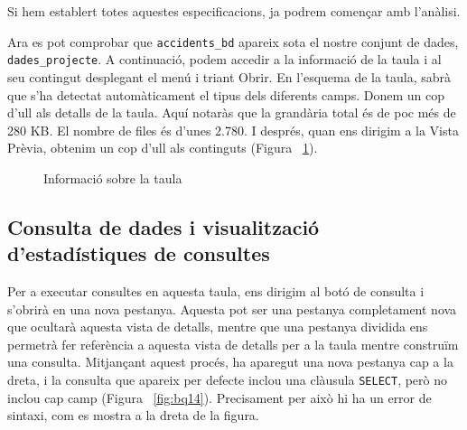\documentclass[12pt,longbibliography]{article}
\theoremstyle{definition}
\theoremstyle{remark}
\begin{document}
\vspace{2mm}

Si hem establert totes aquestes especificacions, ja podrem començar amb l’anàlisi.

\vspace{2mm}

Ara es pot comprobar que \verb|accidents_bd| apareix sota el nostre conjunt de dades, \verb|dades_projecte|. A continuació, podem accedir a la informació de la taula i al seu contingut desplegant el menú i triant Obrir. En l'esquema de la taula, sabrà que s'ha detectat automàticament el tipus dels diferents camps. Donem un cop d'ull als detalls de la taula. Aquí notaràs que la grandària total és de poc més de 280 KB. El nombre de files és d'unes 2.780. I després, quan ens dirigim a la Vista Prèvia, obtenim un cop d'ull als continguts (Figura ~\ref{fig:bq13}). 

\vspace{2mm}
\begin{figure}[h!]
\par
{}%
\hfill
{}%
\par

\caption{Informació sobre la taula}
\label{fig:bq13}
\end{figure}
\vspace{2mm}


\subsection{Consulta de dades i visualització d'estadístiques de consultes}

Per a executar consultes en aquesta taula, ens dirigim al botó de consulta i s'obrirà en una nova pestanya. Aquesta pot ser una pestanya completament nova que ocultarà aquesta vista de detalls, mentre que una pestanya dividida ens permetrà fer referència a aquesta vista de detalls per a la taula mentre construïm una consulta. Mitjançant aquest procés, ha aparegut una nova pestanya cap a la dreta, i la consulta que apareix per defecte inclou una clàusula \verb|SELECT|, però no inclou cap camp (Figura ~\ref{fig:bq14}). Precisament per això hi ha un error de sintaxi, com es mostra a la dreta de la figura. 
\end{document}
